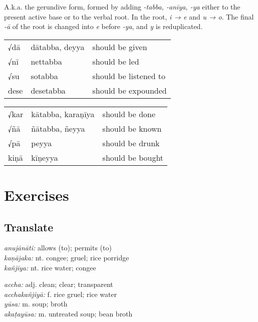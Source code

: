 \documentclass[11pt,oneside]{memoir}
\begin{document}
A.k.a. the gerundive form, formed by adding \emph{-tabba, -anīya, -ya} either to the
present active base or to the verbal root. In the root, \emph{i → e} and \emph{u → o}.
The final \emph{-ā} of the root is changed into \emph{e} before \emph{-ya}, and \emph{y} is reduplicated.

\bigskip
{\centering\par
\begin{multicols}{2}

\begin{center}
\begin{tabular}{lll}
√dā & dātabba, deyya & should be given\\[0pt]
√nī & nettabba & should be led\\[0pt]
√su & sotabba & should be listened to\\[0pt]
dese & desetabba & should be expounded\\[0pt]
\end{tabular}
\end{center}

\columnbreak

\begin{center}
\begin{tabular}{lll}
√kar & kātabba, karaṇīya & should be done\\[0pt]
√ñā & ñātabba, ñeyya & should be known\\[0pt]
√pā & peyya & should be drunk\\[0pt]
kiṇā & kīṇeyya & should be bought\\[0pt]
\end{tabular}
\end{center}

\end{multicols}
\par}

\section{Exercises}
\label{sec:org2a0197b}
\subsection{Translate}
\label{sec:orgc43cb1a}

\begin{twocols}


\emph{anujānāti:} allows (to); permits (to) \\[0pt]
\emph{kaṇājaka:} nt. congee; gruel; rice porridge \\[0pt]
\emph{kañjiya:} nt. rice water; congee

\columnbreak

\emph{accha:} adj. clean; clear; transparent \\[0pt]
\emph{acchakañjiyā:} f. rice gruel; rice water \\[0pt]
\emph{yūsa:} m. soup; broth \\[0pt]
\emph{akaṭayūsa:} m. untreated soup; bean broth
\end{twocols}
\end{document}
